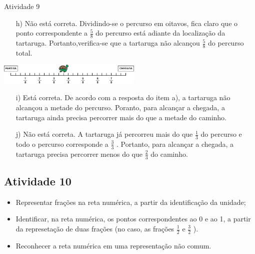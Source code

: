 \begin{multicols}{2}
\begin{resposta*}{Atividade 9}
\begin{enumerate} [\quad a)] %

\item[h)]     Não está correta. Dividindo-se o percurso em oitavos, fica claro que o ponto correspondente a     $\frac{5}{8}$     do percurso está adiante da localização da tartaruga. Portanto,verifica-se que a tartaruga não alcançou     $\frac{5}{8}$     do percurso total.          
\end{enumerate}

 \includegraphics[width=195pt, keepaspectratio]{..//media/cap3/secoes/png/ativ9_resp_h}

\begin{enumerate} [\quad a)] %

  \item[i)]     Está correta. De acordo com a resposta do item a), a tartaruga não alcançou a metade do percurso. Poranto, para alcançar a chegada, a tartaruga ainda precisa percorrer mais do que a metade do caminho.
  \item[j)]     Não está correta. A tartaruga já percorreu mais do que      $\frac{1}{3}$     do percurso e todo o percurso corresponde a      $\frac{3}{3}$    . Portanto, para alcançar a chegada, a tartaruga precisa percorrer menos do que     $\frac{2}{3}$     do caminho.
\end{enumerate} %
\end{resposta*}

\subsection{Atividade 10}

\begin{itemize} %
    \item       Representar frações na reta numérica, a partir da identificação da unidade;
    \item       Identificar, na reta numérica, os pontos correspondentes ao 0 e ao 1, a partir da represetação de duas frações (no caso, as frações       $\frac{1}{2}$       e       $\frac{3}{2}$      ).
    \item       Reconhecer a reta numérica em uma representação não comum.
\end{itemize} %
      

\end{multicols}
